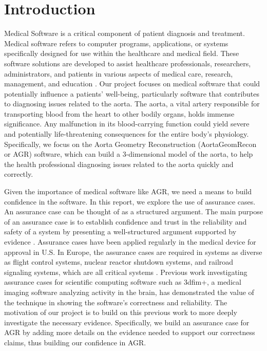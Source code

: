 \chapter{Introduction} \label{intro}

Medical Software is a critical component of patient diagnosis and treatment. Medical software refers to computer programs, applications, or systems specifically designed for use within the healthcare and medical field. These software solutions are developed to assist healthcare professionals, researchers, administrators, and patients in various aspects of medical care, research, management, and education \cite{medical_software}. Our project focuses on medical software that could potentially influence a patients' well-being, particularly software that contributes to diagnosing issues related to the aorta. The aorta, a vital artery responsible for transporting blood from the heart to other bodily organs, holds immense significance. Any malfunction in its blood-carrying function could yield severe and potentially life-threatening consequences for the entire body's physiology. Specifically, we focus on the Aorta Geometry Reconstruction (AortaGeomRecon or AGR) software, which can build a 3-dimensional model of the aorta, to help the health professional diagnosing issues related to the aorta quickly and correctly.

Given the importance of medical software like AGR, we need a means to build confidence in the software. In this report, we explore the use of assurance cases. An assurance case can be thought of as a structured argument. The main purpose of an assurance case is to establish confidence and trust in the reliability and safety of a system by presenting a well-structured argument supported by evidence \cite{Weinstock_2013}. Assurance cases have been applied regularly in the medical device for approval in U.S. In Europe, the assurance cases are required in systems as diverse as flight control systems, nuclear reactor shutdown systems, and railroad signaling systems, which are all critical systems \cite{Weinstock_2013}. Previous work \cite{Nejad2017} \cite{scs_ac} investigating assurance cases for scientific computing software such as 3dfim+, a medical imaging software analyzing activity in the brain, has demonstrated the value of the technique in showing the software's correctness and reliability. The motivation of our project is to build on this previous work to more deeply investigate the necessary evidence. Specifically, we build an assurance case for AGR by adding more details on the evidence needed to support our correctness claims, thus building our confidence in AGR.

